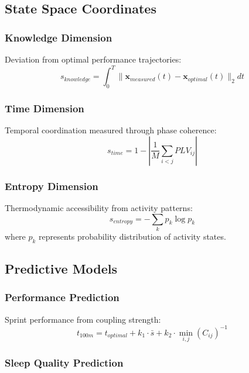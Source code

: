 \documentclass[12pt,twocolumn]{article}
\begin{document}
\subsection{State Space Coordinates}

\subsubsection{Knowledge Dimension}

Deviation from optimal performance trajectories:
\begin{equation}
s_{knowledge} = \int_0^{T} \|\mathbf{x}_{measured}(t) - \mathbf{x}_{optimal}(t)\|_2 dt
\end{equation}

\subsubsection{Time Dimension}

Temporal coordination measured through phase coherence:
\begin{equation}
s_{time} = 1 - \left|\frac{1}{M}\sum_{i<j} PLV_{ij}\right|
\end{equation}

\subsubsection{Entropy Dimension}

Thermodynamic accessibility from activity patterns:
\begin{equation}
s_{entropy} = -\sum_k p_k \log p_k
\end{equation}
where $p_k$ represents probability distribution of activity states.

\subsection{Predictive Models}

\subsubsection{Performance Prediction}

Sprint performance from coupling strength:
\begin{equation}
t_{100m} = t_{optimal} + k_1 \cdot \bar{s} + k_2 \cdot \min_{i,j}(C_{ij})^{-1}
\end{equation}

\subsubsection{Sleep Quality Prediction}
\end{document}
